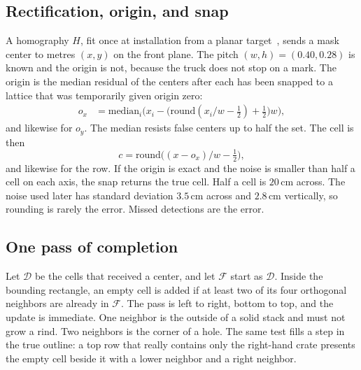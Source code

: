 \documentclass[10pt]{article}
\begin{document}
\subsection{Rectification, origin, and snap}
A homography $H$, fit once at installation from a planar target~\cite{zhang2000,hartley2004}, sends a mask center to metres $(x,y)$ on the front plane. The pitch $(w,h)=(0.40,0.28)$ is known and the origin is not, because the truck does not stop on a mark. The origin is the median residual of the centers after each has been snapped to a lattice that was temporarily given origin zero:
\begin{equation}
\begin{aligned}
o_x&=\mathrm{median}_i\Big(x_i-\big(\mathrm{round}(x_i/w-\tfrac12)+\tfrac12\big)w\Big),
\end{aligned}
\label{eq:origin}
\end{equation}
and likewise for $o_y$. The median resists false centers up to half the set. The cell is then
\begin{equation}
c=\mathrm{round}\big((x-o_x)/w-\tfrac12\big),
\label{eq:snap}
\end{equation}
and likewise for the row. If the origin is exact and the noise is smaller than half a cell on each axis, the snap returns the true cell. Half a cell is $20\,\mathrm{cm}$ across. The noise used later has standard deviation $3.5\,\mathrm{cm}$ across and $2.8\,\mathrm{cm}$ vertically, so rounding is rarely the error. Missed detections are the error.

\subsection{One pass of completion}
Let $\mathcal{D}$ be the cells that received a center, and let $\mathcal{F}$ start as $\mathcal{D}$. Inside the bounding rectangle, an empty cell is added if at least two of its four orthogonal neighbors are already in $\mathcal{F}$. The pass is left to right, bottom to top, and the update is immediate. One neighbor is the outside of a solid stack and must not grow a rind. Two neighbors is the corner of a hole. The same test fills a step in the true outline: a top row that really contains only the right-hand crate presents the empty cell beside it with a lower neighbor and a right neighbor.
\end{document}
